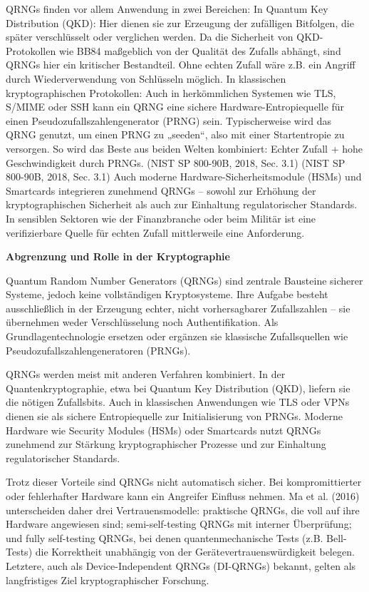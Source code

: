 \noindent
QRNGs finden vor allem Anwendung in zwei Bereichen:
\smallskip
In Quantum Key Distribution (QKD): Hier dienen sie zur Erzeugung der zufälligen Bitfolgen, die später verschlüsselt oder verglichen werden. Da die Sicherheit von QKD-Protokollen wie BB84 maßgeblich von der Qualität des Zufalls abhängt, sind QRNGs hier ein kritischer Bestandteil. Ohne echten Zufall wäre z.B. ein Angriff durch Wiederverwendung von Schlüsseln möglich.
\smallskip
In klassischen kryptographischen Protokollen: Auch in herkömmlichen Systemen wie TLS, S/MIME oder SSH kann ein QRNG eine sichere Hardware-Entropiequelle für einen Pseudozufallszahlengenerator (PRNG) sein. Typischerweise wird das QRNG genutzt, um einen PRNG zu „seeden“, also mit einer Startentropie zu versorgen. So wird das Beste aus beiden Welten kombiniert: Echter Zufall + hohe Geschwindigkeit durch PRNGs. (NIST SP 800-90B, 2018, Sec. 3.1)
\smallskip
(NIST SP 800-90B, 2018, Sec. 3.1)
Auch moderne Hardware-Sicherheitsmodule (HSMs) und Smartcards integrieren zunehmend QRNGs – sowohl zur Erhöhung der kryptographischen Sicherheit als auch zur Einhaltung regulatorischer Standards. In sensiblen Sektoren wie der Finanzbranche oder beim Militär ist eine verifizierbare Quelle für echten Zufall mittlerweile eine Anforderung. \cite{sanguinetti_b_et_al_quantum_2014}


\vspace{1em}
\noindent\textbf{Abgrenzung und Rolle in der Kryptographie}

\noindent
Quantum Random Number Generators (QRNGs) sind zentrale Bausteine sicherer Systeme, jedoch keine vollständigen Kryptosysteme. Ihre Aufgabe besteht ausschließlich in der Erzeugung echter, nicht vorhersagbarer Zufallszahlen – sie übernehmen weder Verschlüsselung noch Authentifikation. Als Grundlagentechnologie ersetzen oder ergänzen sie klassische Zufallsquellen wie Pseudozufallszahlengeneratoren (PRNGs). \cite{herrero-collantes_et_al_quantum_2017}

\noindent
QRNGs werden meist mit anderen Verfahren kombiniert. In der Quantenkryptographie, etwa bei Quantum Key Distribution (QKD), liefern sie die nötigen Zufallsbits. Auch in klassischen Anwendungen wie TLS oder VPNs dienen sie als sichere Entropiequelle zur Initialisierung von PRNGs. Moderne Hardware wie Security Modules (HSMs) oder Smartcards nutzt QRNGs zunehmend zur Stärkung kryptographischer Prozesse und zur Einhaltung regulatorischer Standards. \cite{ma_x_et_al_quantum_2016, sanguinetti_b_et_al_quantum_2014}

\noindent
Trotz dieser Vorteile sind QRNGs nicht automatisch sicher. Bei kompromittierter oder fehlerhafter Hardware kann ein Angreifer Einfluss nehmen. Ma et al. (2016) unterscheiden daher drei Vertrauensmodelle: praktische QRNGs, die voll auf ihre Hardware angewiesen sind; semi-self-testing QRNGs mit interner Überprüfung; und fully self-testing QRNGs, bei denen quantenmechanische Tests (z.B. Bell-Tests) die Korrektheit unabhängig von der Gerätevertrauenswürdigkeit belegen. Letztere, auch als Device-Independent QRNGs (DI-QRNGs) bekannt, gelten als langfristiges Ziel kryptographischer Forschung. \cite{ma_x_et_al_quantum_2016}

